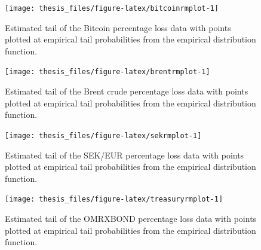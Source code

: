 \documentclass[a4paper,11pt]{article}
\theoremstyle{definition}
\theoremstyle{definition}
\theoremstyle{definition}
\theoremstyle{definition}
\theoremstyle{remark}
\begin{document}
\begin{figure}[H]

{\centering \texttt{[image: thesis\_files/figure-latex/bitcoinrmplot-1]} 

}

\caption{Estimated tail of the Bitcoin percentage loss data with points plotted at empirical tail probabilities from the empirical distribution function.}\label{fig:bitcoinrmplot}
\end{figure}
\begin{figure}[H]

{\centering \texttt{[image: thesis\_files/figure-latex/brentrmplot-1]} 

}

\caption{Estimated tail of the Brent crude percentage loss data with points plotted at empirical tail probabilities from the empirical distribution function.}\label{fig:brentrmplot}
\end{figure}
\begin{figure}[H]

{\centering \texttt{[image: thesis\_files/figure-latex/sekrmplot-1]} 

}

\caption{Estimated tail of the SEK/EUR percentage loss data with points plotted at empirical tail probabilities from the empirical distribution function.}\label{fig:sekrmplot}
\end{figure}
\begin{figure}[H]

{\centering \texttt{[image: thesis\_files/figure-latex/treasuryrmplot-1]} 

}

\caption{Estimated tail of the OMRXBOND percentage loss data with points plotted at empirical tail probabilities from the empirical distribution function.}\label{fig:treasuryrmplot}
\end{figure}
\end{document}
